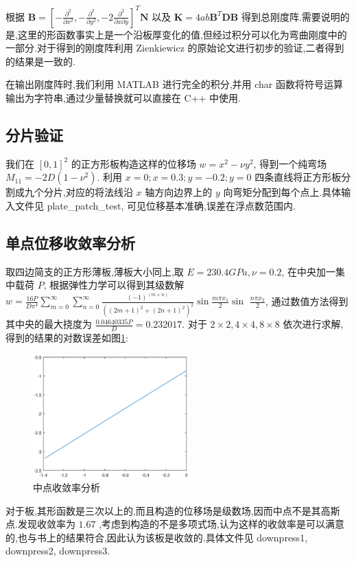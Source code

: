 根据 $\mathbf{B}=[-\frac{\partial^2}{\partial x^2},-\frac{\partial^2}{\partial y^2},-2\frac{\partial^2}{\partial x \partial y}]^T\mathbf{N}$ 以及 $\mathbf{K}=4ab\mathbf{B}^T\mathbf{D}\mathbf{B}$ 得到总刚度阵.需要说明的是,这里的形函数事实上是一个沿板厚变化的值,但经过积分可以化为弯曲刚度中的一部分.对于得到的刚度阵利用 Zienkiewicz 的原始论文进行初步的验证,二者得到的结果是一致的.

在输出刚度阵时,我们利用 MATLAB 进行完全的积分,并用 char 函数将符号运算输出为字符串,通过少量替换就可以直接在 C++ 中使用.

\subsection{分片验证}

我们在 $[0,1]^2$ 的正方形板构造这样的位移场 $w=x^2-\nu y^2$, 得到一个纯弯场 $M_{11}=-2D(1-\nu^2)$. 利用 $x=0;x=0.3;y=-0.2;y=0$ 四条直线将正方形板分割成九个分片,对应的将法线沿 $x$ 轴方向边界上的 $y$ 向弯矩分配到每个点上.具体输入文件见 plate\_patch\_test, 可见位移基本准确,误差在浮点数范围内.

\subsection{单点位移收敛率分析}

取四边简支的正方形薄板,薄板大小同上,取 $E=230.4GPa,\nu=0.2$, 在中央加一集中载荷 $P$, 根据弹性力学可以得到其级数解 $w=\frac{16P}{D\pi^4}\sum\limits_{m=0}^{\infty}\sum\limits_{n=0}^{\infty} \frac{(-1)^(m+n)}{((2m+1)^2+(2n+1)^2)^2}\sin\frac{m\pi x_1}{2}\sin$ $\frac{n\pi x_2}{2}$, 通过数值方法得到其中央的最大挠度为 $\frac{0.04640335P}{D}=0.232017$. 对于 $2\times 2,4\times 4,8\times 8$ 依次进行求解,得到的结果的对数误差如图\ref{platecvg}:

\begin{figure}[htbp]
  \centering
  \includegraphics[width=6cm]{plateconvergence}
  \caption{中点收敛率分析}
  \label{platecvg}
\end{figure}
对于板,其形函数是三次以上的,而且构造的位移场是级数场,因而中点不是其高斯点.发现收敛率为 $1.67$ ,考虑到构造的不是多项式场,认为这样的收敛率是可以满意的,也与书上的结果符合,因此认为该板是收敛的.具体文件见 downpress1, downpress2, downpress3.

